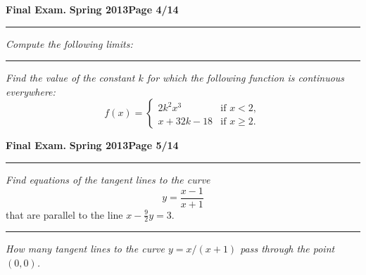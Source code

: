 \documentclass[12pt]{article}
\begin{document}
\newpage


\hfill{\large\bf Final Exam.}\hfill{\large\bf
  Spring 2013}\hfill{\large\bf Page 4/14}\hrule

\bigskip
{\problem[15 pts] \em Compute the following limits:}
\vspace{1cm}

\noindent
{}

\vspace{3cm}
\hrule

{\problem[15 pts] \em Find the value of the constant $k$ for which the
  following function is continuous everywhere:} 
\begin{equation*}
f(x) = \begin{cases}
2k^2x^3 &\text{if }x<2, \\
x+32k-18 &\text{if }x \geq 2.
\end{cases}
\end{equation*}
\vspace{5cm}
\begin{flushright}
\end{flushright}

\newpage

\hfill{\large\bf Final Exam.}\hfill{\large\bf
  Spring 2013}\hfill{\large\bf Page 5/14}\hrule

\bigskip
{\problem[15 pts] \em Find equations of the tangent lines to the curve}
\begin{equation*}
  y = \frac{x-1}{x+1}
\end{equation*}
that are parallel to the line $x-\tfrac{9}{2} y=3$.
\vspace{10cm}
\hrule
{\problem[15 pts] \em How many tangent lines to the curve $y=x/(x+1)$
  pass through the point $(0,0)$.}      
\end{document}
